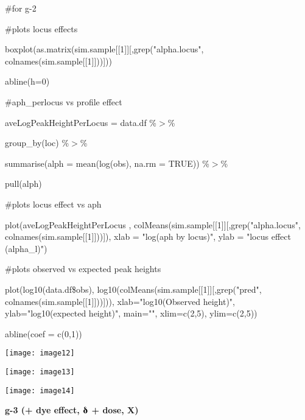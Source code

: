 \documentclass{article} %
\begin{document}
\noindent 

\noindent \#for g-2

\noindent \#plots locus effects

\noindent boxplot(as.matrix(sim.sample[[1]][,grep("alpha.locus", colnames(sim.sample[[1]]))]))

\noindent abline(h=0)

\noindent 

\noindent 

\noindent \#aph\_perlocus vs profile effect

\noindent aveLogPeakHeightPerLocus = data.df \%$\mathrm{>}$\%

\noindent       group\_by(loc) \%$\mathrm{>}$\%

\noindent       summarise(alph = mean(log(obs), na.rm = TRUE)) \%$\mathrm{>}$\%

\noindent       pull(alph)

\noindent 

\noindent \#plots locus effect vs aph

\noindent plot(aveLogPeakHeightPerLocus , colMeans(sim.sample[[1]][,grep("alpha.locus", colnames(sim.sample[[1]]))]), xlab = "log(aph by locus)", ylab = "locus effect (alpha\_l)")

\noindent 

\noindent 

\noindent 

\noindent \#plots observed vs expected peak heights

\noindent plot(log10(data.df\$obs), log10(colMeans(sim.sample[[1]][,grep("pred", colnames(sim.sample[[1]]))])), xlab="log10(Observed height)", ylab="log10(expected height)", main="", xlim=c(2,5), ylim=c(2,5))

\noindent abline(coef = c(0,1))

\noindent 

\noindent \texttt{[image: image12]}

\noindent 

\noindent \texttt{[image: image13]}

\noindent 

\noindent \texttt{[image: image14]}

\noindent \eject 

\noindent \textbf{g-3 (+ dye effect, $\boldsymbol{\deltaup}$ + dose, X)}

\noindent 
\end{document}
